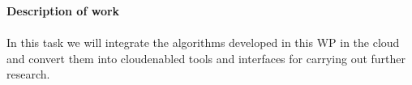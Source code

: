 \textbf{Description of work}\\
\\
In this task we will integrate the algorithms developed in this WP in the cloud and convert them into cloudenabled tools and interfaces for carrying out further research.


